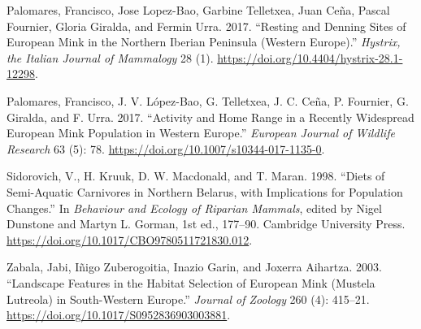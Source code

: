 \documentclass[
  letterpaper,
  DIV=11,
  numbers=noendperiod]{scrreprt}
\newlength{\cslhangindent}
\newenvironment{CSLReferences}[2] %
 {\begin{list}{}{%
  \setlength{\itemindent}{0pt}
  \setlength{\leftmargin}{0pt}
  \setlength{\parsep}{0pt}
  \ifodd #1
   \setlength{\leftmargin}{\cslhangindent}
   \setlength{\itemindent}{-1\cslhangindent}
  \fi
  \setlength{\itemsep}{#2\baselineskip}}}
 {\end{list}}
\begin{document}
\begin{CSLReferences}{1}{0}
Palomares, Francisco, Jose Lopez-Bao, Garbine Telletxea, Juan Ceña,
Pascal Fournier, Gloria Giralda, and Fermin Urra. 2017. {``Resting and
Denning Sites of {European} Mink in the Northern {Iberian} {Peninsula}
({Western} {Europe}).''} \emph{Hystrix, the Italian Journal of
Mammalogy} 28 (1). \url{https://doi.org/10.4404/hystrix-28.1-12298}.

Palomares, Francisco, J. V. López-Bao, G. Telletxea, J. C. Ceña, P.
Fournier, G. Giralda, and F. Urra. 2017. {``Activity and Home Range in a
Recently Widespread {European} Mink Population in {Western} {Europe}.''}
\emph{European Journal of Wildlife Research} 63 (5): 78.
\url{https://doi.org/10.1007/s10344-017-1135-0}.

Sidorovich, V., H. Kruuk, D. W. Macdonald, and T. Maran. 1998. {``Diets
of Semi-Aquatic Carnivores in Northern {Belarus}, with Implications for
Population Changes.''} In \emph{Behaviour and {Ecology} of {Riparian}
{Mammals}}, edited by Nigel Dunstone and Martyn L. Gorman, 1st ed.,
177--90. Cambridge University Press.
\url{https://doi.org/10.1017/CBO9780511721830.012}.

Zabala, Jabi, Iñigo Zuberogoitia, Inazio Garin, and Joxerra Aihartza.
2003. {``Landscape Features in the Habitat Selection of {European} Mink
({Mustela} Lutreola) in South-Western {Europe}.''} \emph{Journal of
Zoology} 260 (4): 415--21.
\url{https://doi.org/10.1017/S0952836903003881}.

\end{CSLReferences}
\end{document}
